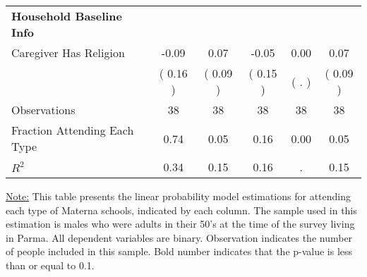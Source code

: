 \begin{table}[H]
{\begin{tabular}{lccccc}
\midrule
\textbf{Household Baseline Info} \\
\quad Caregiver Has Religion &     -0.09 &      0.07 &     -0.05 &      0.00 &      0.07 \\
\quad  & (     0.16 ) & (     0.09 )  & (     0.15 )  & (        . ) & (     0.09 ) \\
\midrule
Observations & 38 & 38 & 38 & 38 & 38 \\
Fraction Attending Each Type &      0.74 &      0.05 &      0.16 &      0.00 &      0.05 \\
\midrule
$ R^2$ &      0.34 &      0.15 &      0.16 &         . &      0.15 \\
\bottomrule
\end{tabular}}
\end{table}
\begin{footnotesize}
\noindent\underline{Note:} This table presents the linear probability model estimations for attending each type of Materna schools, indicated by each column. The sample used in this estimation is males who were adults in their 50's at the time of the survey living in Parma. All dependent variables are binary. Observation indicates the number of people included in this sample. Bold number indicates that the p-value is less than or equal to 0.1.
\end{footnotesize}
